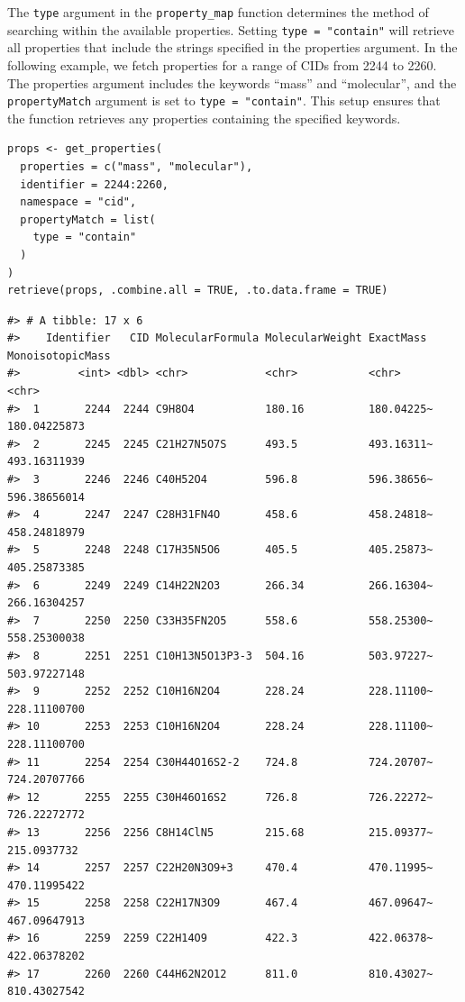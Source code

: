 The \texttt{type} argument in the \texttt{property\_map} function determines the method of searching within the available properties. Setting \texttt{type\ =\ "contain"} will retrieve all properties that include the strings specified in the properties argument. In the following example, we fetch properties for a range of CIDs from 2244 to 2260. The properties argument includes the keywords ``mass'' and ``molecular'', and the \texttt{propertyMatch} argument is set to \texttt{type\ =\ "contain"}. This setup ensures that the function retrieves any properties containing the specified keywords.

\begin{verbatim}
props <- get_properties(
  properties = c("mass", "molecular"),
  identifier = 2244:2260,
  namespace = "cid",
  propertyMatch = list(
    type = "contain"
  )
)
retrieve(props, .combine.all = TRUE, .to.data.frame = TRUE)
\end{verbatim}

\begin{verbatim}
#> # A tibble: 17 x 6
#>    Identifier   CID MolecularFormula MolecularWeight ExactMass  MonoisotopicMass
#>         <int> <dbl> <chr>            <chr>           <chr>      <chr>           
#>  1       2244  2244 C9H8O4           180.16          180.04225~ 180.04225873    
#>  2       2245  2245 C21H27N5O7S      493.5           493.16311~ 493.16311939    
#>  3       2246  2246 C40H52O4         596.8           596.38656~ 596.38656014    
#>  4       2247  2247 C28H31FN4O       458.6           458.24818~ 458.24818979    
#>  5       2248  2248 C17H35N5O6       405.5           405.25873~ 405.25873385    
#>  6       2249  2249 C14H22N2O3       266.34          266.16304~ 266.16304257    
#>  7       2250  2250 C33H35FN2O5      558.6           558.25300~ 558.25300038    
#>  8       2251  2251 C10H13N5O13P3-3  504.16          503.97227~ 503.97227148    
#>  9       2252  2252 C10H16N2O4       228.24          228.11100~ 228.11100700    
#> 10       2253  2253 C10H16N2O4       228.24          228.11100~ 228.11100700    
#> 11       2254  2254 C30H44O16S2-2    724.8           724.20707~ 724.20707766    
#> 12       2255  2255 C30H46O16S2      726.8           726.22272~ 726.22272772    
#> 13       2256  2256 C8H14ClN5        215.68          215.09377~ 215.0937732     
#> 14       2257  2257 C22H20N3O9+3     470.4           470.11995~ 470.11995422    
#> 15       2258  2258 C22H17N3O9       467.4           467.09647~ 467.09647913    
#> 16       2259  2259 C22H14O9         422.3           422.06378~ 422.06378202    
#> 17       2260  2260 C44H62N2O12      811.0           810.43027~ 810.43027542
\end{verbatim}

